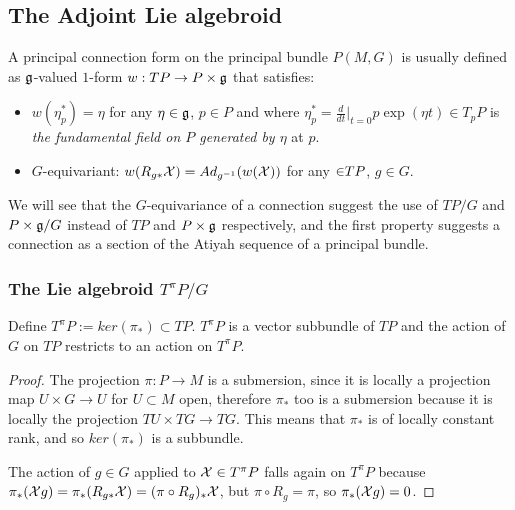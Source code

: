 \subsection{The Adjoint Lie algebroid}

A principal connection form on the principal bundle $P(M, G)$ is usually defined as $\mathfrak{g}$-valued $1$-form  $w: TP \to P \times \mathfrak{g}$ that satisfies:

    \begin{itemize}
    
    \item $w(\eta_p^*) = \eta$ for any $\eta \in \mathfrak{g}$, $p \in P$ and where $\eta_p^* = \frac{d}{dt}\bigr|_{t = 0} p\exp(\eta t)\in T_p P$ is \emph{the fundamental field on $P$ generated by $\eta$} at $p$.
    
    \item $G$-equivariant: $w(R_{g*} \mathcal{X}) = Ad_{g^{-1}}( w(\mathcal{X}))$ for any $\mathcal{\in} TP$, $g \in G$.
    
    \end{itemize}

We will see that the $G$-equivariance of a connection suggest the use of $TP/G$ and $P \times \mathfrak{g} / G$ instead of $TP$ and $P \times \mathfrak{g}$ respectively, and the first property suggests a connection as a section of the Atiyah sequence of a principal bundle. 

\subsubsection{The Lie algebroid $T^\pi P/G$}

\begin{lemma}
Define $T^\pi P := ker(\pi_*) \subset TP$. $T^\pi P$ is a vector subbundle of $TP$ and the action of $G$ on $TP$ restricts to an action on $T^\pi P$.
\end{lemma}

\begin{proof}
The projection $\pi:P \to M$ is a submersion, since it is locally a projection map $U \times G \to U$ for $U \subset M$ open, therefore $\pi_*$ too is a submersion because it is locally the projection $TU \times TG \to TG$. This means that $\pi_*$ is of locally constant rank, and so $ker(\pi_*)$ is a subbundle.

The action of $g \in G$ applied to $\mathcal{X} \in T^\pi P$ falls again on $T^\pi P$ because $\pi_*(\mathcal{X}g) = \pi_*(R_{g*} \mathcal{X}) = (\pi \circ R_g)_* \mathcal{X}$, but $\pi \circ R_g = \pi$, so $\pi_*(\mathcal{X}g) = 0$.
\end{proof}


